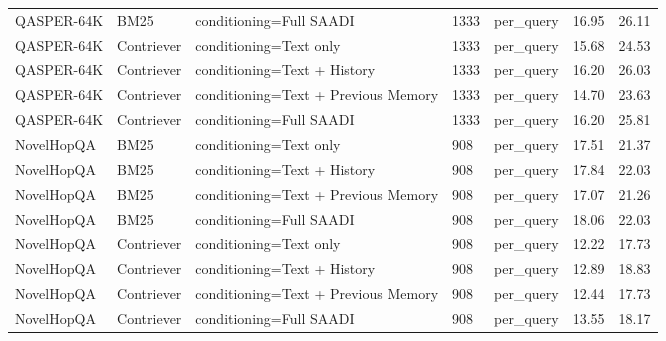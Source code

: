 \begin{tabular}{lllllll}
QASPER-64K & BM25 & conditioning=Full SAADI & 1333 & per\_query & 16.95 & 26.11 \\
QASPER-64K & Contriever & conditioning=Text only & 1333 & per\_query & 15.68 & 24.53 \\
QASPER-64K & Contriever & conditioning=Text + History & 1333 & per\_query & 16.20 & 26.03 \\
QASPER-64K & Contriever & conditioning=Text + Previous Memory & 1333 & per\_query & 14.70 & 23.63 \\
QASPER-64K & Contriever & conditioning=Full SAADI & 1333 & per\_query & 16.20 & 25.81 \\
NovelHopQA & BM25 & conditioning=Text only & 908 & per\_query & 17.51 & 21.37 \\
NovelHopQA & BM25 & conditioning=Text + History & 908 & per\_query & 17.84 & 22.03 \\
NovelHopQA & BM25 & conditioning=Text + Previous Memory & 908 & per\_query & 17.07 & 21.26 \\
NovelHopQA & BM25 & conditioning=Full SAADI & 908 & per\_query & 18.06 & 22.03 \\
NovelHopQA & Contriever & conditioning=Text only & 908 & per\_query & 12.22 & 17.73 \\
NovelHopQA & Contriever & conditioning=Text + History & 908 & per\_query & 12.89 & 18.83 \\
NovelHopQA & Contriever & conditioning=Text + Previous Memory & 908 & per\_query & 12.44 & 17.73 \\
NovelHopQA & Contriever & conditioning=Full SAADI & 908 & per\_query & 13.55 & 18.17 \\
\hline
\end{tabular}
